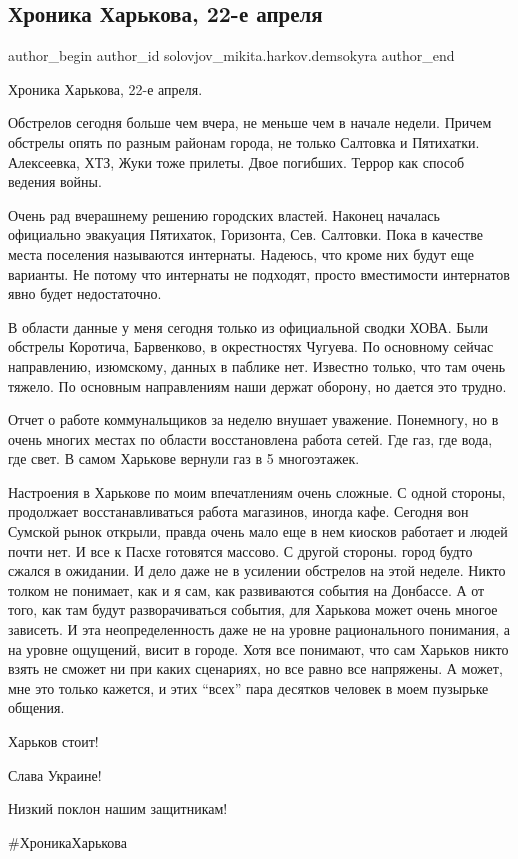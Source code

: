  
 
 
 
 
 
\subsection{Хроника Харькова, 22-е апреля}
\label{sec:22_04_2022.fb.solovjov_mikita.harkov.demsokyra.1.hronika}
 
\ifcmt
 author_begin
   author_id solovjov_mikita.harkov.demsokyra
 author_end
\fi

Хроника Харькова, 22-е апреля. 

Обстрелов сегодня больше чем вчера, не меньше чем в начале недели. Причем
обстрелы опять по разным районам города, не только Салтовка и Пятихатки.
Алексеевка, ХТЗ, Жуки тоже прилеты. Двое погибших. Террор как способ ведения
войны. 

Очень рад вчерашнему решению городских властей. Наконец началась официально
эвакуация Пятихаток, Горизонта, Сев. Салтовки. Пока в качестве места поселения
называются интернаты. Надеюсь, что кроме них будут еще варианты. Не потому что
интернаты не подходят, просто вместимости интернатов явно будет недостаточно. 

В области данные у меня сегодня только из официальной сводки ХОВА. Были
обстрелы Коротича, Барвенково, в окрестностях Чугуева. По основному сейчас
направлению, изюмскому, данных в паблике нет. Известно только, что там очень
тяжело. По основным направлениям наши держат оборону, но дается это трудно. 

Отчет о работе коммунальщиков за неделю внушает уважение. Понемногу, но в очень
многих местах по области восстановлена работа сетей. Где газ, где вода, где
свет. В самом Харькове вернули газ в 5 многоэтажек. 

Настроения в Харькове по моим впечатлениям очень сложные. С одной стороны,
продолжает восстанавливаться работа магазинов, иногда кафе. Сегодня вон Сумской
рынок открыли, правда очень мало еще в нем киосков работает и людей почти нет.
И все к Пасхе готовятся массово. С другой стороны. город будто сжался в
ожидании. И дело даже не в усилении обстрелов на этой неделе. Никто толком не
понимает, как и я сам, как развиваются события на Донбассе. А от того, как там
будут разворачиваться события, для Харькова может очень многое зависеть. И эта
неопределенность даже не на уровне рационального понимания, а на уровне
ощущений, висит в городе. Хотя все понимают, что сам Харьков никто взять не
сможет ни при каких сценариях, но все равно все напряжены. А может, мне это
только кажется, и этих \enquote{всех} пара десятков человек в моем пузырьке общения. 

Харьков стоит!

Слава Украине!

Низкий поклон нашим защитникам!

\#ХроникаХарькова


